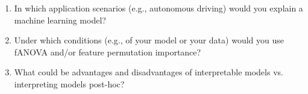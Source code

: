 \begin{enumerate}
\item In which application scenarios (e.g., autonomous driving) would you explain a machine learning model?
\item Under which conditions (e.g., of your model or your data) would you use fANOVA and/or feature permutation importance?
\item What could be advantages and disadvantages of interpretable models vs. interpreting models post-hoc?
\end{enumerate}
